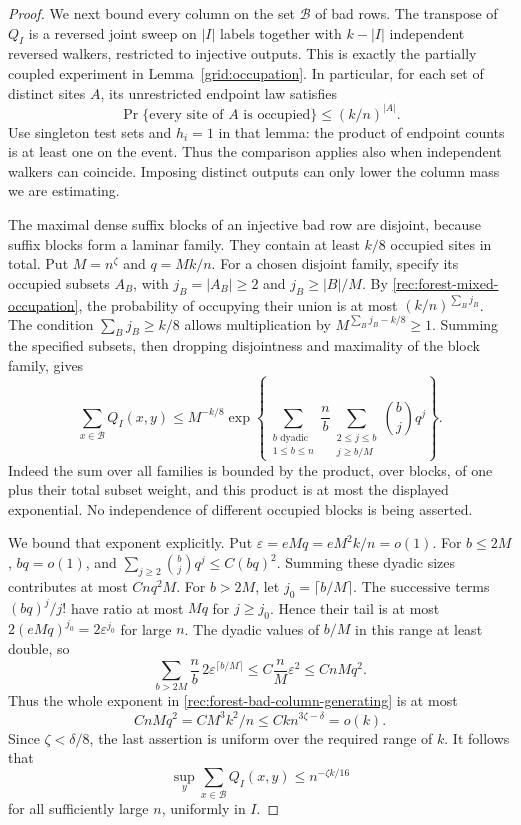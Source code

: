\begin{proof}
We next bound every column on the set $\mathcal B$ of bad
rows.  The transpose of $Q_I$ is a reversed joint sweep on
$|I|$ labels together with $k-|I|$ independent reversed
walkers, restricted to injective outputs.
This is exactly the partially coupled experiment in
Lemma~\ref{grid:occupation}.  In particular, for each set
of distinct sites $A$, its unrestricted endpoint law satisfies
\begin{equation}\label{rec:forest-mixed-occupation}
 \Pr\{\text{every site of }A\text{ is occupied}\}
 \le(k/n)^{|A|}.
\end{equation}
Use singleton test sets and $h_i=1$ in that lemma: the
product of endpoint counts is at least one on the event.
Thus the comparison applies also when independent walkers
can coincide.  Imposing distinct outputs can only lower
the column mass we are estimating.

The maximal dense suffix blocks of an injective bad row
are disjoint, because suffix blocks form a laminar family.
They contain at least $k/8$ occupied sites in total.
Put $M=n^\zeta$ and $q=Mk/n$.
For a chosen disjoint family, specify its occupied subsets
$A_B$, with $j_B=|A_B|\ge2$ and $j_B\ge |B|/M$.
By \eqref{rec:forest-mixed-occupation}, the probability of
occupying their union is at most $(k/n)^{\sum_Bj_B}$.
The condition $\sum_Bj_B\ge k/8$ allows multiplication
by $M^{\sum_Bj_B-k/8}\ge1$.
Summing the specified subsets, then dropping disjointness
and maximality of the block family, gives
\begin{equation}\label{rec:forest-bad-column-generating}
 \sum_{x\in\mathcal B}Q_I(x,y)
 \le M^{-k/8}\exp\left\{
   \sum_{\substack{b\text{ dyadic}\\1\le b\le n}}
     \frac nb
     \sum_{\substack{2\le j\le b\\j\ge b/M}}
                   \binom bj q^j\right\}.
\end{equation}
Indeed the sum over all families is bounded by the
product, over blocks, of one plus their total subset
weight, and this product is at most the displayed
exponential.  No independence of different occupied
blocks is being asserted.

We bound that exponent explicitly.  Put
$\varepsilon=eMq=eM^2k/n=o(1)$.
For $b\le2M$, $bq=o(1)$, and
$\sum_{j\ge2}\binom bj q^j\le C(bq)^2$.
Summing these dyadic sizes contributes at most
$Cnq^2M$.  For $b>2M$, let $j_0=\lceil b/M\rceil$.
The successive terms $(bq)^j/j!$ have ratio at most
$Mq$ for $j\ge j_0$.  Hence their tail is at most
$2(eMq)^{j_0}=2\varepsilon^{j_0}$ for large $n$.
The dyadic values of $b/M$ in this range at least double,
so
\[
 \sum_{b>2M}\frac nb\,2\varepsilon^{\lceil b/M\rceil}
 \le C\frac nM\varepsilon^2
 \le CnMq^2.
\]
Thus the whole exponent in
\eqref{rec:forest-bad-column-generating} is at most
\[
 CnMq^2=C M^3 k^2/n
 \le Ck n^{3\zeta-\delta}=o(k).
\]
Since $\zeta<\delta/8$, the last assertion is uniform
over the required range of $k$.  It follows that
\begin{equation}\label{rec:forest-small-bad-column}
 \sup_y\sum_{x\in\mathcal B}Q_I(x,y)
 \le n^{-\zeta k/16}
\end{equation}
for all sufficiently large $n$, uniformly in $I$.


\end{proof}
